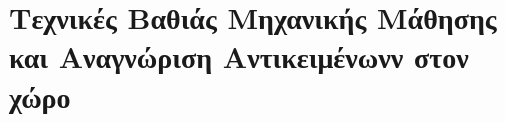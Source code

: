 \chapter{Τεχνικές Βαθιάς Μηχανικής Μάθησης και Αναγνώριση Αντικειμένωνν στον χώρο}
\label{chapter:sota}




